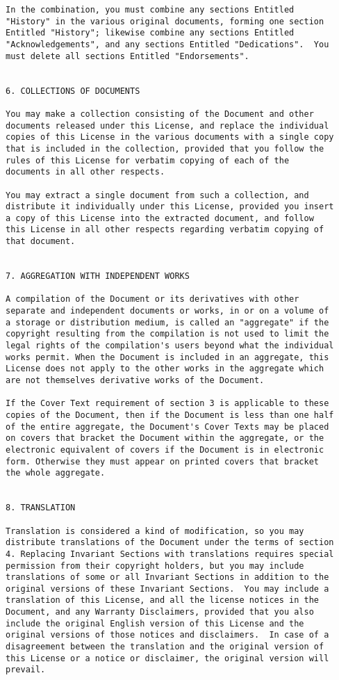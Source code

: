 \begin{verbatim}
In the combination, you must combine any sections Entitled
"History" in the various original documents, forming one section
Entitled "History"; likewise combine any sections Entitled
"Acknowledgements", and any sections Entitled "Dedications".  You
must delete all sections Entitled "Endorsements".


6. COLLECTIONS OF DOCUMENTS

You may make a collection consisting of the Document and other
documents released under this License, and replace the individual
copies of this License in the various documents with a single copy
that is included in the collection, provided that you follow the
rules of this License for verbatim copying of each of the
documents in all other respects.

You may extract a single document from such a collection, and
distribute it individually under this License, provided you insert
a copy of this License into the extracted document, and follow
this License in all other respects regarding verbatim copying of
that document.


7. AGGREGATION WITH INDEPENDENT WORKS

A compilation of the Document or its derivatives with other
separate and independent documents or works, in or on a volume of
a storage or distribution medium, is called an "aggregate" if the
copyright resulting from the compilation is not used to limit the
legal rights of the compilation's users beyond what the individual
works permit. When the Document is included in an aggregate, this
License does not apply to the other works in the aggregate which
are not themselves derivative works of the Document.

If the Cover Text requirement of section 3 is applicable to these
copies of the Document, then if the Document is less than one half
of the entire aggregate, the Document's Cover Texts may be placed
on covers that bracket the Document within the aggregate, or the
electronic equivalent of covers if the Document is in electronic
form. Otherwise they must appear on printed covers that bracket
the whole aggregate.


8. TRANSLATION

Translation is considered a kind of modification, so you may
distribute translations of the Document under the terms of section
4. Replacing Invariant Sections with translations requires special
permission from their copyright holders, but you may include
translations of some or all Invariant Sections in addition to the
original versions of these Invariant Sections.  You may include a
translation of this License, and all the license notices in the
Document, and any Warranty Disclaimers, provided that you also
include the original English version of this License and the
original versions of those notices and disclaimers.  In case of a
disagreement between the translation and the original version of
this License or a notice or disclaimer, the original version will
prevail.


\end{verbatim}
